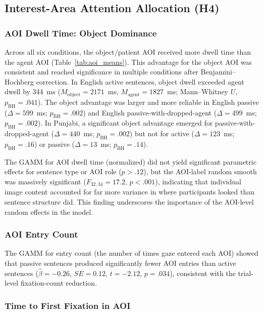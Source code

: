 \documentclass[12pt, a4paper]{article}
\begin{document}
\subsection{Interest-Area Attention Allocation (H4)}

\subsubsection{AOI Dwell Time: Object Dominance}

Across all six conditions, the object/patient AOI received more dwell time
than the agent AOI (Table~\ref{tab:aoi_means}).
This advantage for the object AOI was consistent and reached
significance in multiple conditions after Benjamini--Hochberg correction.
In English active sentences, object dwell exceeded agent dwell by
344~ms ($M_{\text{object}} = 2171$~ms, $M_{\text{agent}} = 1827$~ms;
Mann--Whitney $U$, $p_{\text{BH}} = .041$).
The object advantage was larger and more reliable in English passive
($\Delta = 599$~ms; $p_{\text{BH}} = .002$) and English passive-with-dropped-agent
($\Delta = 499$~ms; $p_{\text{BH}} = .002$).
In Punjabi, a significant object advantage emerged for passive-with-dropped-agent
($\Delta = 440$~ms; $p_{\text{BH}} = .002$) but not for active ($\Delta = 123$~ms;
$p_{\text{BH}} = .16$) or passive ($\Delta = 13$~ms; $p_{\text{BH}} = .14$).

The GAMM for AOI dwell time (normalized) did not yield significant parametric
effects for sentence type or AOI role ($p > .12$), but the AOI-label random
smooth was massively significant ($F_{32,34} = 17.2$, $p < .001$), indicating
that individual image content accounted for far more variance in where
participants looked than sentence structure did.
This finding underscores the importance of the AOI-level random effects
in the model.

\subsubsection{AOI Entry Count}

The GAMM for entry count (the number of times gaze entered each AOI)
showed that passive sentences produced significantly fewer AOI entries than
active sentences ($\hat{\beta} = -0.26$, $SE = 0.12$, $t = -2.12$, $p = .034$),
consistent with the trial-level fixation-count reduction.

\subsubsection{Time to First Fixation in AOI}
\end{document}
